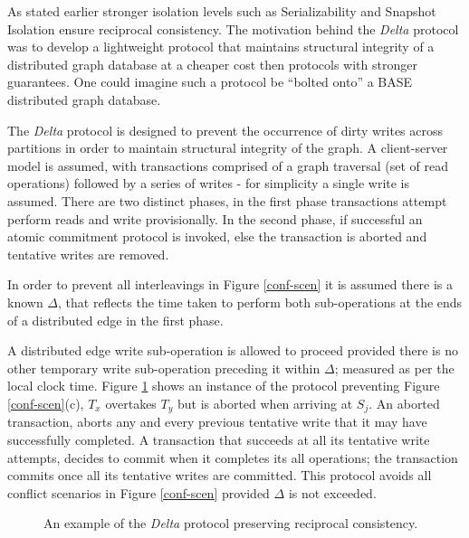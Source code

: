\documentclass[sigplan,10pt]{acmart}
\begin{document}
As stated earlier stronger isolation levels such as Serializability and Snapshot Isolation ensure reciprocal consistency. The motivation behind the \emph{Delta} protocol was to develop a lightweight protocol that maintains structural integrity of a distributed graph database at a cheaper cost then protocols with stronger guarantees. One could imagine such a protocol be ``bolted onto'' a BASE distributed graph database.

The \emph{Delta} protocol is designed to prevent the occurrence of dirty writes across partitions in order to maintain structural integrity of the graph. A client-server model is assumed, with transactions comprised of a graph traversal (set of read operations) followed by a series of writes - for simplicity a single write is assumed. There are two distinct phases, in the first phase transactions attempt perform reads and write provisionally. In the second phase, if successful an atomic commitment protocol is invoked, else the transaction is aborted and tentative writes are removed.

In order to prevent all interleavings in Figure \ref{conf-scen} it is assumed there is a known $\Delta$, that reflects the time taken to perform both sub-operations at the ends of a distributed edge in the first phase.

A distributed edge write sub-operation is allowed to proceed provided there is no other temporary write sub-operation preceding it within $\Delta$; measured as per the local clock time. Figure \ref{delta-abort} shows an instance of the protocol preventing Figure \ref{conf-scen}(c), $T_x$ overtakes $T_y$ but is aborted when arriving at $S_j$. An aborted transaction, aborts any and every previous tentative write that it may have successfully completed. A transaction that succeeds at all its tentative write attempts, decides to commit when it completes its all operations; the transaction commits once all its tentative writes are committed. This protocol avoids all conflict scenarios in Figure \ref{conf-scen} provided $\Delta$ is not exceeded.

\begin{figure}[H]
  \centering
  \caption{An example of the \emph{Delta} protocol preserving reciprocal consistency.}
  \label{delta-abort}
\end{figure}
\end{document}
